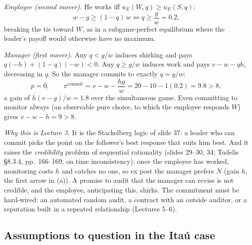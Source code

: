 \documentclass[11pt,a4paper]{article}
\begin{document}
\emph{Employee (second mover).} He works iff $u_E(W, q) \ge u_E(S, q)$:
\[
  w - g \ge (1 - q)\, w \iff q \ge \frac{g}{w} = 0.2,
\]
breaking the tie toward $W$, as in a subgame-perfect equilibrium where the leader's payoff would
otherwise have no maximum.

\emph{Manager (first mover).} Any $q < g/w$ induces shirking and pays $q(-h) + (1 - q)(-w) < 0$. Any
$q \ge g/w$ induces work and pays $v - w - q h$, decreasing in $q$. So the manager commits to exactly
$q = g/w$:
\[
  p = 0, \qquad \pi^{\text{commit}} = v - w - \frac{h g}{w} = 20 - 10 - 1(0.2) = 9.8 > 8,
\]
a gain of $h(v - g)/w = 1.8$ over the simultaneous game. Even committing to monitor always (an
observable pure choice, to which the employee responds $W$) gives $v - w - h = 9 > 8$.

\emph{Why this is Lecture 3.} It is the Stackelberg logic of slide 37: a leader who can commit
picks the point on the follower's best response that suits him best. And it raises the
\emph{credibility} problem of sequential rationality (slides 29--30, 34; Tadelis \S8.3.4,
pp.~166--169, on time inconsistency): once the employee has worked, monitoring costs $h$ and catches
no one, so ex post the manager prefers $N$ (gain $h$, the first arrow in (a)). A promise to audit
that the manager can revise is not credible, and the employee, anticipating this, shirks. The
commitment must be hard-wired: an automated random audit, a contract with an outside auditor, or a
reputation built in a repeated relationship (Lectures 5--6).

\subsection*{Assumptions to question in the Itaú case}
\end{document}
